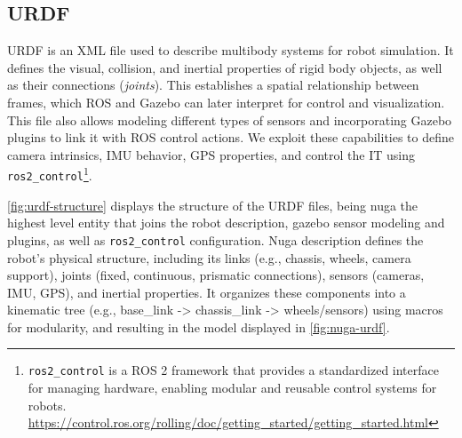 \subsection{URDF}
\ac{URDF} is an XML file used to describe multibody systems for robot simulation. It defines the visual, collision, and inertial properties of rigid body objects, as well as their connections (\emph{joints}). This establishes a spatial relationship between frames, which ROS and Gazebo can later interpret for control and visualization. This file also allows modeling different types of sensors and incorporating Gazebo plugins to link it with ROS control actions. We exploit these capabilities to define camera intrinsics, IMU behavior, GPS properties, and control the \ac{IT} using \texttt{ros2\_control}\footnote{\texttt{ros2\_control} is a ROS 2 framework that provides a standardized interface for managing hardware, enabling modular and reusable control systems for robots. \url{https://control.ros.org/rolling/doc/getting_started/getting_started.html}}.

\autoref{fig:urdf-structure} displays the structure of the URDF files, being nuga the highest level entity that joins the robot description, gazebo sensor modeling and plugins, as well as \texttt{ros2\_control} configuration. Nuga description defines the robot's physical structure, including its links (e.g., chassis, wheels, camera support), joints (fixed, continuous, prismatic connections), sensors (cameras, IMU, GPS), and inertial properties. It organizes these components into a kinematic tree (e.g., base\_link -> chassis\_link -> wheels/sensors) using macros for modularity, and resulting in the model displayed in \autoref{fig:nuga-urdf}.

